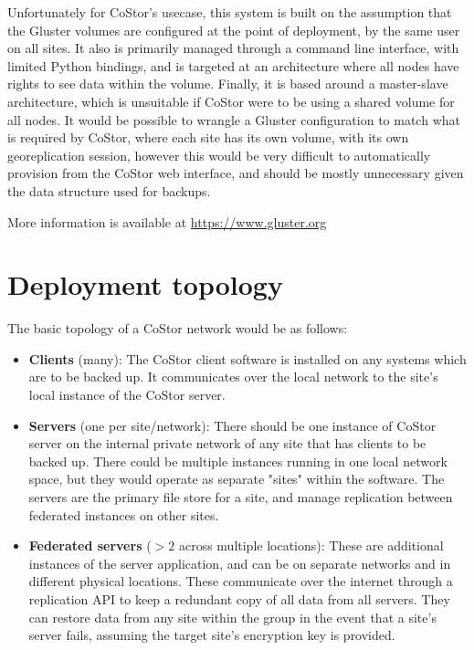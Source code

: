 \documentclass[bsc,frontabs,twoside,singlespacing,parskip,deptreport]{infthesis}     %
\begin{document}
Unfortunately for CoStor's usecase, this system is built on the assumption that the Gluster 
volumes are configured at the point of deployment, by the same user on all sites. It also is
primarily managed through a command line interface, with limited Python bindings, and is targeted
at an architecture where all nodes have rights to see data within the volume. Finally, it is
based around a master-slave architecture, which is unsuitable if CoStor were to be using a shared
volume for all nodes. It would be possible to wrangle a Gluster configuration to match what is
required by CoStor, where each site has its own volume, with its own georeplication session, 
however this would be very difficult to automatically provision from the CoStor web interface, 
and should be mostly unnecessary given the data structure used for backups.

More information is available at \url{https://www.gluster.org} \cite{gluster-home}

\section{Deployment topology}

The basic topology of a CoStor network would be as follows:

\begin{itemize}
	\item \textbf{Clients} (many):
	\subitem The CoStor client software is installed on any systems which are to be backed up.
	It communicates over the local network to the site's local instance of the CoStor server.
	
	\item \textbf{Servers} (one per site/network):
	\subitem  There should be one instance of CoStor server on the internal private network of 
	any site that has clients to be backed up. There could be multiple instances running in one
	local network space, but they would operate as separate "sites" within the software. The 
	servers are the primary file store for a site, and manage replication between federated
	instances on other sites.
	
	\item \textbf{Federated servers} ($>2$ across multiple locations):
	\subitem These are additional instances of the server application, and can be on separate
	networks and in different physical locations. These communicate over the internet through
	a replication API to keep a redundant copy of all data from all servers. They can restore
	data from any site within the group in the event that a site's server fails, assuming the 
	target site's encryption key is provided.
\end{itemize}
\end{document}
